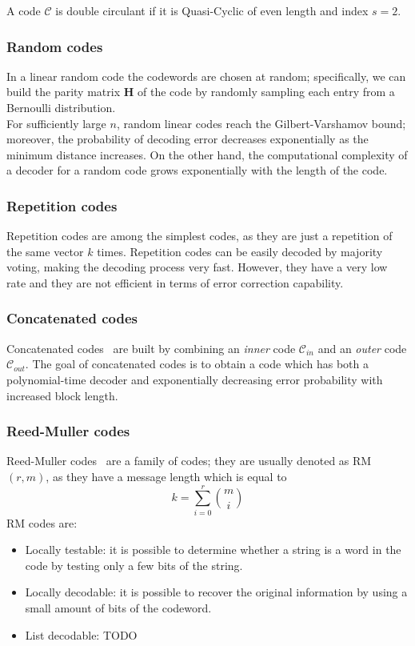 \begin{definition}
    A code $\mathcal{C}$ is double circulant if it is Quasi-Cyclic of even length and index $s=2$.
\end{definition}

\subsubsection{Random codes}
    In a linear random code the codewords are chosen at random; specifically, we can build the parity matrix $\mathbf{H}$ of
    the code by randomly sampling each entry from a Bernoulli distribution.\\
    For sufficiently large $n$, random linear codes reach the Gilbert-Varshamov bound; moreover, the probability of decoding
    error decreases exponentially as the minimum distance increases. On the other hand, the computational complexity of a decoder
    for a random code grows exponentially with the length of the code.

\subsubsection{Repetition codes}
    Repetition codes are among the simplest codes, as they are just a repetition of the same vector $k$ times.
    Repetition codes can be easily decoded by majority voting, making the decoding process very fast. However,
    they have a very low rate and they are not efficient in terms of error correction capability.

\subsubsection{Concatenated codes}
    Concatenated codes~\cite{forney1965concatenated} are built by combining an \textit{inner} code $\mathcal{C}_{in}$ and an
    \textit{outer} code $\mathcal{C}_{out}$. The goal of concatenated codes is to obtain a code which has both a 
    polynomial-time decoder and exponentially decreasing error probability with increased block length.

\subsubsection{Reed-Muller codes}
    Reed-Muller codes~\cite{reed1953class,muller1954application} are a family of codes; they are usually denoted as \textsf{RM}$(r,m)$, 
    as they have a message length which is equal to
    \begin{equation*}
        k = \sum_{i=0}^r \binom{m}{i}
    \end{equation*}
    RM codes are:
    \begin{itemize}
        \item Locally testable: it is possible to determine whether a string is a word in the code by testing only a few bits of the string.
        \item Locally decodable: it is possible to recover the original information by using a small amount of bits of the codeword.
        \item List decodable: TODO
    \end{itemize}

